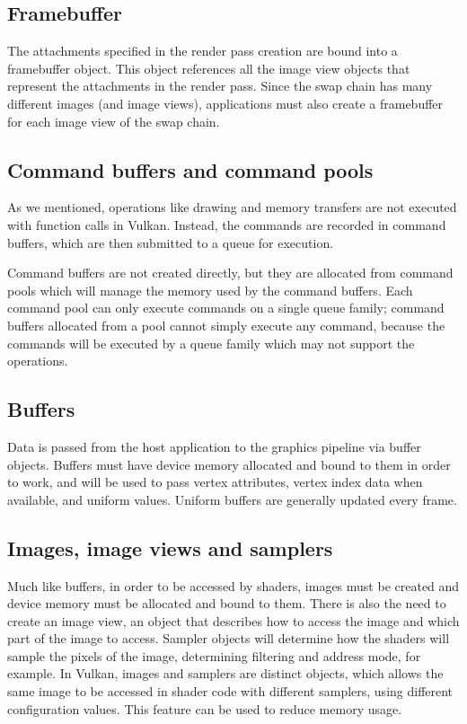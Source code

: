 \subsection{Framebuffer}
The attachments specified in the render pass creation are bound into a framebuffer object. This object references all the image view objects that represent the attachments in the render pass. Since the swap chain has many different images (and image views), applications must also create a framebuffer for each image view of the swap chain.

\subsection{Command buffers and command pools}
As we mentioned, operations like drawing and memory transfers are not executed with function calls in Vulkan. Instead, the commands are recorded in command buffers, which are then submitted to a queue for execution.

Command buffers are not created directly, but they are allocated from command pools which will manage the memory used by the command buffers. Each command pool can only execute commands on a single queue family; command buffers allocated from a pool cannot simply execute any command, because the commands will be executed by a queue family which may not support the operations.

\subsection{Buffers}
Data is passed from the host application to the graphics pipeline via buffer objects. Buffers must have device memory allocated and bound to them in order to work, and will be used to pass vertex attributes, vertex index data when available, and uniform values. Uniform buffers are generally updated every frame.

\subsection{Images, image views and samplers}
Much like buffers, in order to be accessed by shaders, images must be created and device memory must be allocated and bound to them. There is also the need to create an image view, an object that describes how to access the image and which part of the image to access. Sampler objects will determine how the shaders will sample the pixels of the image, determining filtering and address mode, for example. In Vulkan, images and samplers are distinct objects, which allows the same image to be accessed in shader code with different samplers, using different configuration values. This feature can be used to reduce memory usage.

